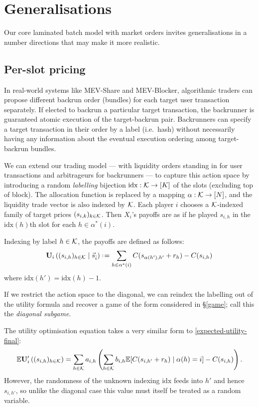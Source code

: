 \section{Generalisations}

Our core laminated batch model with market orders invites generalisations in a number directions that may make it more realistic.

\subsection{Per-slot pricing} 
\label{multi-price}

In real-world systems like MEV-Share and MEV-Blocker, algorithmic traders can propose different backrun order (bundles) for each target user transaction separately.
%
If elected to backrun a particular target transaction, the backrunner is guaranteed atomic execution of the target-backrun pair.
%
Backrunners can specify a target transaction in their order by a label (i.e.~hash) without necessarily having any information about the eventual execution ordering among target-backrun bundles. 

We can extend our trading model --- with liquidity orders standing in for user transactions and arbitrageurs for backrunners --- to capture this action space by introducing a random \emph{labelling} bijection $\mathrm{idx}:\mathcal{K}\rightarrow [K]$ of the slots (excluding top of block).
%
The allocation function is replaced by a mapping $\alpha:\mathcal{K}\rightarrow[N]$, and the liquidity trade vector is also indexed by $\mathcal{K}$.
%
Each player $i$ chooses a $\mathcal{K}$-indexed family of target prices $(s_{i,k})_{k\in\mathcal{K}}$.
%
Then $X_i$'s payoffs are as if he played $s_{i,h}$ in the $\mathrm{idx}(h)$th slot for each $h\in\alpha^*(i)$.

Indexing by label $h\in\mathcal{K}$, the payoffs are defined as follows:
\begin{equation}
  \Utility_i\left( (s_{i,h})_{h\in\labels} \mid \vec{s}_{\hat{i}} \right) \defeq %
    \sum_{h\in\alpha^*(i)} C(s_{\alpha(h'),h'} + r_h ) - C(s_{i,h})
\end{equation}
where $\mathrm{idx}(h') = \mathrm{idx}(h)-1$.

If we restrict the action space to the diagonal, we can reindex the labelling out of the utility formula and recover a game of the form considered in \S\ref{game}; call this the \emph{diagonal subgame}.

The utility optimisation equation takes a very similar form to \eqref{expected-utility-final}:
\begin{equation}
  \Expectation\Utility'_i\left( (s_{i,h})_{h\in\labels}\right) = %
    \sum_{h\in\labels}a_{i,h}\left(\sum_{h\in\labels}b_{i,h} \Expectation[C(s_{i,h'} + r_h )\mid \alpha(h)=i ] - C(s_{i,h}) \right).
\end{equation}
However, the randomness of the unknown indexing $\mathrm{idx}$ feeds into $h'$ and hence $s_{i,h'}$, so unlike the diagonal case this value must itself be treated as a random variable.


